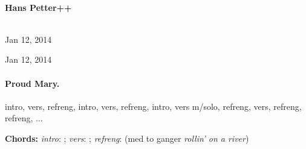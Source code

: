\documentclass[%
twoside,                 %
draft,                   %
final,                   %
10pt]{article}
\begin{document}
\begin{center}
\ \\ [2mm]


\author{Hans Petter++}

\author{Hans Petter++\inst{}}
\institute{}

\begin{center}
{\bf Hans Petter++${}^{}$} \\ [0mm]
\end{center}

\begin{center}
\end{center}


\date{Jan 12, 2014}
\maketitle
\date{Jan 12, 2014
}

\ \\ [10mm]
{\large\textsf{Jan 12, 2014}}

\end{center}
\vfill
\clearpage

\begin{center}
Jan 12, 2014
\end{center}

\vspace{1cm}



\tableofcontents

\vspace{1cm} %





\paragraph{Proud Mary.}
intro, vers, refreng, intro, vers, refreng, intro, vers m/solo, refreng,
vers, refreng, refreng, ...

\textbf{Chords:} \emph{intro}: ;
\emph{vers}: ; \emph{refreng}:  (med to ganger \emph{rollin' on a river})
\end{document}
